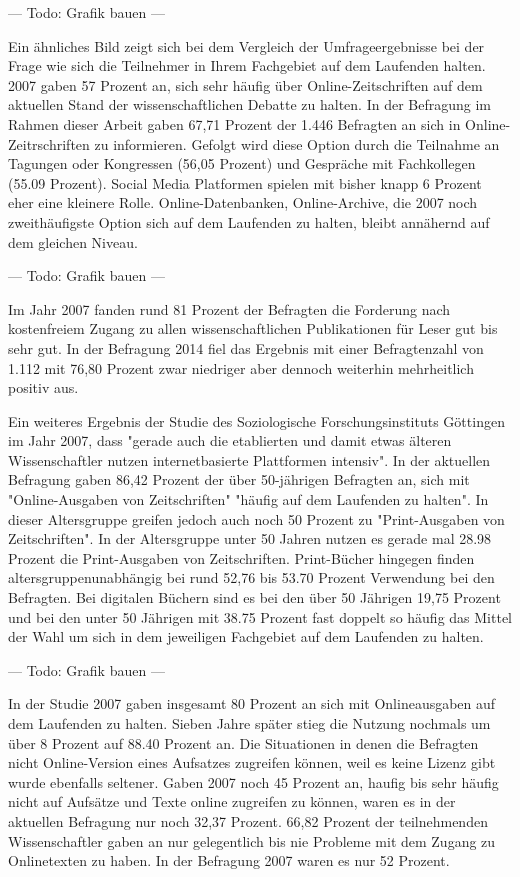 --- Todo: Grafik bauen ---

Ein ähnliches Bild zeigt sich bei dem Vergleich der Umfrageergebnisse bei der Frage wie sich die Teilnehmer in Ihrem Fachgebiet auf dem Laufenden halten. 2007 gaben 57 Prozent an, sich sehr häufig über Online-Zeitschriften auf dem aktuellen Stand der wissenschaftlichen Debatte zu halten. In der Befragung im Rahmen dieser Arbeit gaben 67,71 Prozent der 1.446 Befragten an sich in Online-Zeitrschriften zu informieren. Gefolgt wird diese Option durch die Teilnahme an Tagungen oder Kongressen (56,05 Prozent) und Gespräche mit Fachkollegen (55.09 Prozent). Social Media Platformen spielen mit bisher knapp 6 Prozent eher eine kleinere Rolle. Online-Datenbanken, Online-Archive, die 2007 noch zweithäufigste Option sich auf dem Laufenden zu halten, bleibt annähernd auf dem gleichen Niveau.

--- Todo: Grafik bauen ---

Im Jahr 2007 fanden rund 81 Prozent der Befragten die Forderung nach kostenfreiem Zugang zu allen wissenschaftlichen Publikationen für Leser gut bis sehr gut. In der Befragung 2014 fiel das Ergebnis mit einer Befragtenzahl von 1.112 mit 76,80 Prozent zwar niedriger aber dennoch weiterhin mehrheitlich positiv aus.

Ein weiteres Ergebnis der Studie des Soziologische Forschungsinstituts Göttingen im Jahr 2007, dass "gerade auch die etablierten und damit etwas älteren Wissenschaftler nutzen internetbasierte Plattformen intensiv". In der aktuellen Befragung gaben 86,42 Prozent der über 50-jährigen Befragten an, sich mit "Online-Ausgaben von Zeitschriften" "häufig auf dem Laufenden zu halten". In dieser Altersgruppe greifen jedoch auch noch 50 Prozent zu "Print-Ausgaben von Zeitschriften". In der Altersgruppe unter 50 Jahren nutzen es gerade mal 28.98 Prozent die Print-Ausgaben von Zeitschriften. Print-Bücher hingegen finden altersgruppenunabhängig bei rund 52,76 bis 53.70 Prozent Verwendung bei den Befragten. Bei digitalen Büchern sind es bei den über 50 Jährigen 19,75 Prozent und bei den unter 50 Jährigen mit 38.75 Prozent fast doppelt so häufig das Mittel der Wahl um sich in dem jeweiligen Fachgebiet auf dem Laufenden zu halten.

--- Todo: Grafik bauen ---

In der Studie 2007 gaben insgesamt 80 Prozent an sich mit Onlineausgaben auf dem Laufenden zu halten. Sieben Jahre später stieg die Nutzung nochmals um über 8 Prozent auf 88.40 Prozent an. Die Situationen in denen die Befragten nicht Online-Version eines Aufsatzes zugreifen können, weil es keine Lizenz gibt wurde ebenfalls seltener. Gaben 2007 noch 45 Prozent an, haufig bis sehr häufig nicht auf Aufsätze und Texte online zugreifen zu können, waren es in der aktuellen Befragung nur noch 32,37 Prozent. 66,82 Prozent der teilnehmenden Wissenschaftler gaben an nur gelegentlich bis nie Probleme mit dem Zugang zu Onlinetexten zu haben. In der Befragung 2007 waren es nur 52 Prozent.

